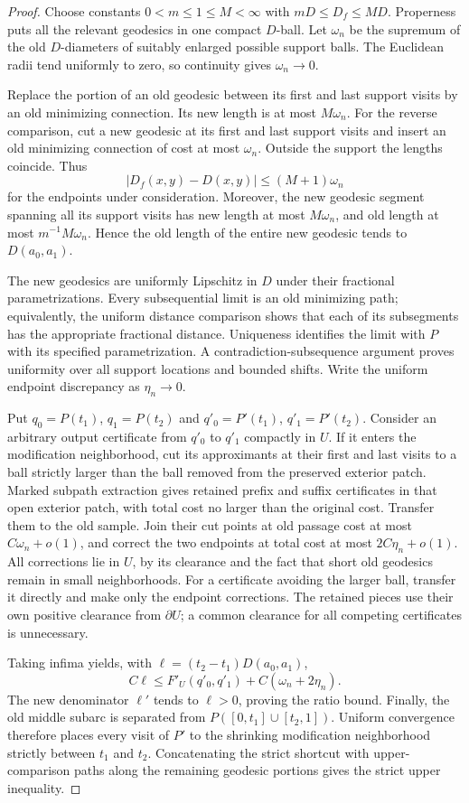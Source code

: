 \begin{proof}
Choose constants $0<m\le1\le M<\infty$ with
$mD\le D_f\le MD$.  Properness puts all the relevant geodesics
in one compact $D$-ball.  Let $\omega_n$ be the supremum of the
old $D$-diameters of suitably enlarged possible support balls.
The Euclidean radii tend uniformly to zero, so continuity gives
$\omega_n\to0$.

Replace the portion of an old geodesic between its first and
last support visits by an old minimizing connection.  Its new
length is at most $M\omega_n$.  For the reverse comparison,
cut a new geodesic at its first and last support visits and
insert an old minimizing connection of cost at most
$\omega_n$.  Outside the support the lengths coincide.  Thus
\[
 |D_f(x,y)-D(x,y)|\le(M+1)\omega_n
\]
for the endpoints under consideration.  Moreover, the new
geodesic segment spanning all its support visits has new length
at most $M\omega_n$, and old length at most
$m^{-1}M\omega_n$.  Hence the old length of the entire new
geodesic tends to $D(a_0,a_1)$.

The new geodesics are uniformly Lipschitz in $D$ under their
fractional parametrizations.  Every subsequential limit is an
old minimizing path; equivalently, the uniform distance
comparison shows that each of its subsegments has the
appropriate fractional distance.  Uniqueness identifies the
limit with $P$ with its specified parametrization.  A
contradiction-subsequence argument proves uniformity over all
support locations and bounded shifts.  Write the uniform
endpoint discrepancy as $\eta_n\to0$.

Put $q_0=P(t_1)$, $q_1=P(t_2)$ and
$q'_0=P'(t_1)$, $q'_1=P'(t_2)$.  Consider an arbitrary
output certificate from $q'_0$ to $q'_1$ compactly in $U$.
If it enters the modification neighborhood, cut its
approximants at their first and last visits to a ball strictly
larger than the ball removed from the preserved exterior
patch.  Marked subpath extraction gives retained prefix and
suffix certificates in that open exterior patch, with total
cost no larger than the original cost.  Transfer them to the
old sample.  Join their cut points at old passage cost at
most $C\omega_n+o(1)$, and correct the two endpoints at total
cost at most $2C\eta_n+o(1)$.  All corrections lie in $U$,
by its clearance and the fact that short old geodesics remain
in small neighborhoods.  For a certificate avoiding the
larger ball, transfer it directly and make only the endpoint
corrections.  The retained pieces use their own positive
clearance from $\partial U$; a common clearance for all
competing certificates is unnecessary.

Taking infima yields, with
$\ell=(t_2-t_1)D(a_0,a_1)$,
\[
 C\ell\le F'_U(q'_0,q'_1)+C(\omega_n+2\eta_n).
\]
The new denominator $\ell'$ tends to $\ell>0$, proving the
ratio bound.  Finally, the old middle subarc is separated
from $P([0,t_1]\cup[t_2,1])$.  Uniform convergence therefore
places every visit of $P'$ to the shrinking modification
neighborhood strictly between $t_1$ and $t_2$.  Concatenating
the strict shortcut with upper-comparison paths along the
remaining geodesic portions gives the strict upper inequality.
\end{proof}


